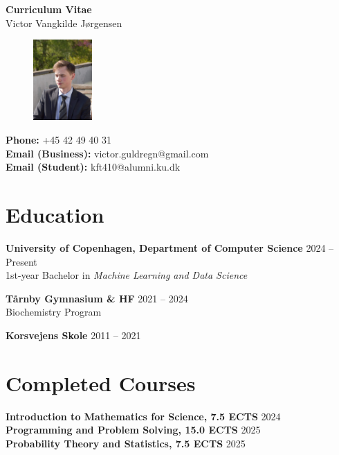 \documentclass[a4paper,10pt]{article}
\makeatletter
\newcommand{\name}{Victor Vangkilde J\o rgensen}
\newcommand{\phone}{+45 42 49 40 31}
\newcommand{\emailBusiness}{victor.guldregn@gmail.com}
\newcommand{\emailStudent}{kft410@alumni.ku.dk}
\makeatother
\begin{document}
\begin{center}
    {\LARGE \textbf{Curriculum Vitae}}\\[1ex]
    {\large \name}
\end{center}

\begin{figure}[h!]
    \centering
    \includegraphics[width=0.2\textwidth, trim={1cm 0 1.5cm 4cm},clip]{profilbillede.jpg}
\end{figure}

\noindent
\textbf{Phone:} \phone \\
\textbf{Email (Business):} \emailBusiness \\
\textbf{Email (Student):} \emailStudent \\

\section*{Education}
\textbf{University of Copenhagen, Department of Computer Science} \hfill 2024 -- Present \\
1st-year Bachelor in \textit{Machine Learning and Data Science}

\textbf{T\aa rnby Gymnasium \& HF} \hfill 2021 -- 2024 \\
Biochemistry Program

\textbf{Korsvejens Skole} \hfill 2011 -- 2021 \\

\section*{Completed Courses}
\textbf{Introduction to Mathematics for Science, 7.5 ECTS} \hfill 2024 \\
\textbf{Programming and Problem Solving, 15.0 ECTS} \hfill 2025 \\
\textbf{Probability Theory and Statistics, 7.5 ECTS} \hfill 2025 \\
\end{document}

